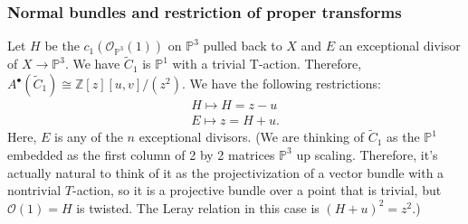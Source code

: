 \documentclass[12 pt, reqno]{amsart}
\theoremstyle{definition}
\newcommand{\mb}{\mathbb}
\newcommand{\ms}{\mathscr}
\newcommand{\wt}{\widetilde}
\begin{document}
\subsubsection{Normal bundles and restriction of proper transforms}
Let $H$ be the $c_1(\ms{O}_{\mb{P}^3}(1))$ on $\mb{P}^3$ pulled back
to $X$ and $E$ an exceptional divisor of $X\to \mb{P}^3$. We have
$\wt{C}_1$ is $\mb{P}^1$ with a trivial T-action. Therefore,
$A^{\bullet}(\wt{C}_1)\cong \mb{Z}[z][u,v]/(z^2)$. We have the
following restrictions:
\begin{align*}
H \mapsto H=z-u\\
E\mapsto z = H+u. 
\end{align*}
Here, $E$ is any of the $n$ exceptional divisors.  (We are thinking of
$\wt{C}_1$ as the $\mb{P}^1$ embedded as the first column of 2 by 2
matrices $\mb{P}^3$ up scaling. Therefore, it's actually natural to
think of it as the projectivization of a vector bundle with a
nontrivial $T$-action, so it is a projective bundle over a point that
is trivial, but $\ms{O}(1)=H$ is twisted. The Leray relation in this
case is $(H+u)^2=z^2$.)
\end{document}
